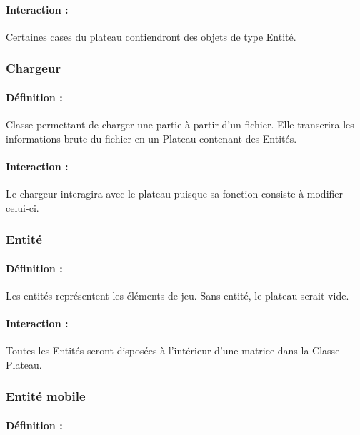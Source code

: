 \documentclass[12pt]{article}
\begin{document}
				\paragraph{Interaction :}

				Certaines cases du plateau contiendront des objets de type Entité.
				

			\subsubsection{Chargeur}

				\paragraph{Définition :}

				Classe permettant de charger une partie à partir d'un fichier. Elle transcrira les informations brute du fichier en un Plateau contenant des Entités.

				\paragraph{Interaction :}

				Le chargeur interagira avec le plateau puisque sa fonction consiste à modifier celui-ci.

			\subsubsection{Entité}

				\paragraph{Définition :}

				Les entités représentent les éléments de jeu. Sans entité, le plateau serait vide.

				\paragraph{Interaction :}

				Toutes les Entités seront disposées à l'intérieur d'une matrice dans la Classe Plateau.

			\subsubsection{Entité mobile}

				\paragraph{Définition :}
\end{document}
